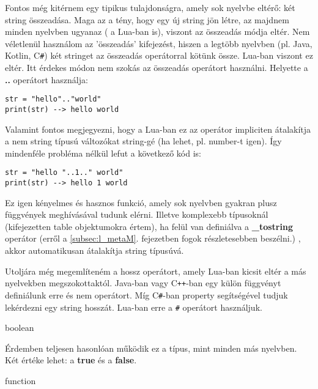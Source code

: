 Fontos még kitérnem egy tipikus tulajdonságra, amely sok nyelvbe eltérő: két string összeadása. Maga az a tény, hogy egy új string jön létre, az majdnem minden nyelvben ugyanaz ( a Lua-ban is), viszont az összeadás módja eltér. Nem véletlenül használom az 'összeadás' kifejezést, hiszen a legtöbb nyelvben (pl. Java, Kotlin, C\verb|#|) két stringet az összeadás operátorral kötünk össze. Lua-ban viszont ez eltér. Itt érdekes módon nem szokás az összeadás operátort használni. Helyette a \textbf{..} operátort használja:
\scriptsize
\begin{lstlisting}
str = "hello".."world"
print(str) --> hello world
\end{lstlisting}
\normalsize
Valamint fontos megjegyezni, hogy a Lua-ban ez az operátor impliciten átalakítja a nem string típusú változókat string-gé (ha lehet, pl. number-t igen). Így mindenféle probléma nélkül lefut a következő kód is:
\scriptsize
\begin{lstlisting}
str = "hello "..1.." world"
print(str) --> hello 1 world
\end{lstlisting}
\normalsize
Ez igen kényelmes és hasznos funkció, amely sok nyelvben gyakran plusz függvények meghívásával tudunk elérni. Illetve komplexebb típusoknál (kifejezetten table objektumokra értem), ha felül van definiálva a \textbf{\_tostring} operátor (erről a \ref{subsec:l_metaM}. fejezetben fogok részletesebben beszélni.) , akkor automatikusan átalakítja string típusúvá.

Utoljára még megemlíteném a hossz operátort, amely Lua-ban kicsit eltér a más nyelvekben megszokottaktól. Java-ban vagy C\verb|++|-ban egy külön függvényt definiálunk erre és nem operátort. Míg C\verb|#|-ban property segítségével tudjuk lekérdezni egy string hosszát. Lua-ban erre a \verb|#| operátort használjuk.

\bigskip

\Large boolean \normalsize

\bigskip

Érdemben teljesen hasonlóan működik ez a típus, mint minden más nyelvben. Két értéke lehet: a \textbf{true} és a \textbf{false}.


\bigskip

\Large function \normalsize

\bigskip

